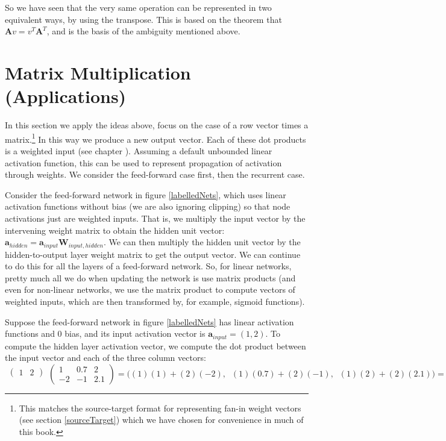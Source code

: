 So we have seen that the very same operation can be represented in two equivalent ways, by using the transpose. This is based on the theorem that  $\mathbf{A}v =  v^T\mathbf{A}^T$, and is the basis of the ambiguity mentioned above. 

\section{Matrix Multiplication (Applications)}


In this section we apply the ideas above, focus on the case of a row vector times a matrix.\footnote{This matches the source-target format for representing fan-in weight vectors (see section \ref{sourceTarget}) which we have chosen for convenience in much of this book.} In this way we produce a new output vector. Each of these dot products is a weighted input (see chapter ). Assuming a default unbounded linear activation function, this can be used to represent propagation of activation through weights. We consider the feed-forward case first, then the recurrent case.

Consider the feed-forward network in figure \ref{labelledNets}, which uses linear activation functions without bias (we are also ignoring clipping) so that node activations just are weighted inputs. That is, we multiply the input vector by the intervening weight matrix to obtain the hidden unit vector:  $\textbf{a}_{hidden} = \textbf{a}_{input} \textbf{W}_{input,hidden}$. We can then multiply the hidden unit vector by the hidden-to-output layer weight matrix to get the output vector. We can continue to do this for all the layers of a feed-forward network. So, for linear networks, pretty much all we do when updating the network is use matrix products (and even for non-linear networks, we use the matrix product to compute vectors of weighted inputs, which are then transformed by, for example, sigmoid functions).

Suppose the feed-forward network in figure \ref{labelledNets} has linear activation functions and 0 bias, and its input activation vector is $\textbf{a}_{input} = (1,2)$. To compute the hidden layer activation vector, we compute the dot product between the input vector and each of the three column vectors:
\[
  \begin{matrix}\begin{pmatrix}1 & 2\end{pmatrix}\\\mbox{}\end{matrix}
  \begin{pmatrix} 1 & 0.7 & 2 \\ -2 & -1 & 2.1 \end{pmatrix} 
  =
  \bigg( (1)(1) + (2)(-2) ,\;\; (1)(0.7) + (2)(-1) ,\;\; (1)(2)+ (2)(2.1) \bigg)
  =
  \begin{pmatrix}  -3 \;\; -1.3 \;\;\; 6.2  \end{pmatrix}
\]
\vspace*{.1cm} 

